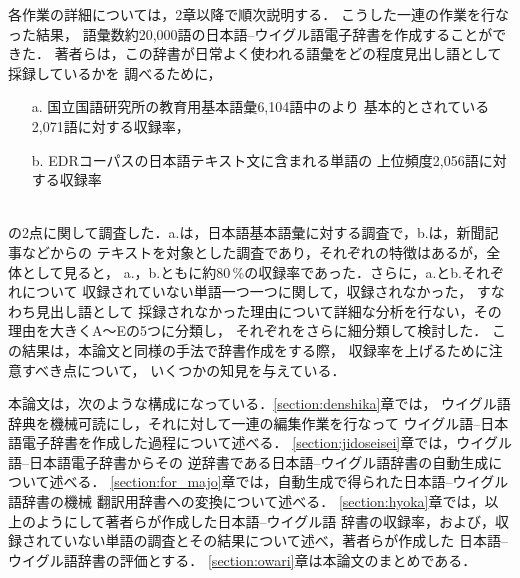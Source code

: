 各作業の詳細については，2章以降で順次説明する．
こうした一連の作業を行なった結果，
語彙数約20,000語の日本語--ウイグル語電子辞書を作成することができた．
著者らは，この辞書が日常よく使われる語彙をどの程度見出し語として採録しているかを
調べるために，\\

\begin{itemize}
\item[a.] 国立国語研究所の教育用基本語彙\cite{KOKKEN}6,104語中のより
基本的とされている2,071語に対する収録率，
\item[b.] EDRコーパス\cite{EDRCORPUS}の日本語テキスト文に含まれる単語の
上位頻度2,056語に対する収録率
\end{itemize}

\mbox{} \\
の2点に関して調査した．a.は，日本語基本語彙に対する調査で，b.は，新聞記事などからの
テキストを対象とした調査であり，それぞれの特徴はあるが，全体として見ると，
a.，b.ともに約80\,\%の収録率であった．さらに，a.とb.それぞれについて
収録されていない単語一つ一つに関して，収録されなかった，
すなわち見出し語として
採録されなかった理由について詳細な分析を行ない，その理由を大きくA〜Eの5つに分類し，
それぞれをさらに細分類して検討した．
この結果は，本論文と同様の手法で辞書作成をする際，
収録率を上げるために注意すべき点について，
いくつかの知見を与えている．

本論文は，次のような構成になっている．\ref{section:denshika}章では，
ウイグル語辞典\cite{UJDIC}を機械可読にし，それに対して一連の編集作業を行なって
ウイグル語--日本語電子辞書を作成した過程について述べる．
\ref{section:jidoseisei}章では，ウイグル語--日本語電子辞書からその
逆辞書である日本語--ウイグル語辞書の自動生成について述べる．
\ref{section:for_majo}章では，自動生成で得られた日本語--ウイグル語辞書の機械
翻訳用辞書への変換について述べる．
\ref{section:hyoka}章では，以上のようにして著者らが作成した日本語--ウイグル語
辞書の収録率，および，収録されていない単語の調査とその結果について述べ，著者らが作成した
日本語--ウイグル語辞書の評価とする．
\ref{section:owari}章は本論文のまとめである．

